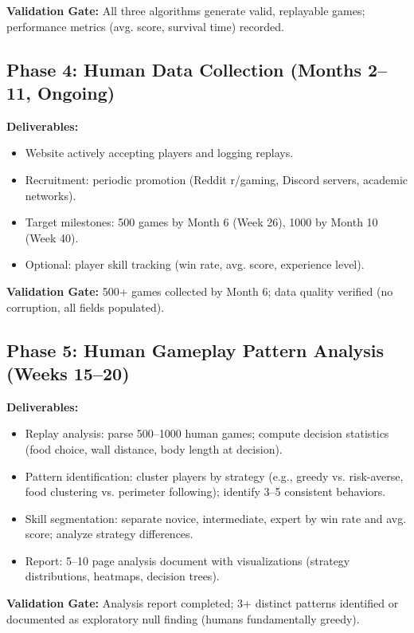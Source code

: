 \documentclass[a4paper]{article}
\begin{document}
\textbf{Validation Gate:} All three algorithms generate valid, replayable games; performance metrics (avg. score, survival time) recorded.

\subsection{Phase 4: Human Data Collection (Months 2--11, Ongoing)}

\textbf{Deliverables:}
\begin{itemize}
\item Website actively accepting players and logging replays.
\item Recruitment: periodic promotion (Reddit r/gaming, Discord servers, academic networks).
\item Target milestones: 500 games by Month 6 (Week 26), 1000 by Month 10 (Week 40).
\item Optional: player skill tracking (win rate, avg. score, experience level).
\end{itemize}

\textbf{Validation Gate:} 500+ games collected by Month 6; data quality verified (no corruption, all fields populated).

\subsection{Phase 5: Human Gameplay Pattern Analysis (Weeks 15--20)}

\textbf{Deliverables:}
\begin{itemize}
\item Replay analysis: parse 500--1000 human games; compute decision statistics (food choice, wall distance, body length at decision).
\item Pattern identification: cluster players by strategy (e.g., greedy vs. risk-averse, food clustering vs. perimeter following); identify 3--5 consistent behaviors.
\item Skill segmentation: separate novice, intermediate, expert by win rate and avg. score; analyze strategy differences.
\item Report: 5--10 page analysis document with visualizations (strategy distributions, heatmaps, decision trees).
\end{itemize}

\textbf{Validation Gate:} Analysis report completed; 3+ distinct patterns identified or documented as exploratory null finding (humans fundamentally greedy).
\end{document}
